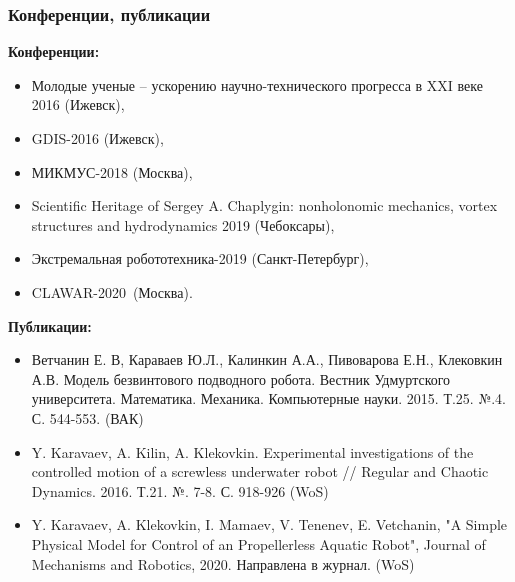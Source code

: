 \begin{frame}[shrink=25]
\frametitle{Конференции, публикации}

\textbf{Конференции:} 

\begin{itemize}
	
\item Молодые ученые -- ускорению научно-технического прогресса в XXI веке 2016 (Ижевск),

\item GDIS-2016 (Ижевск), 

\item МИКМУС-2018 (Москва), 

\item Scientific Heritage of Sergey A. Chaplygin: nonholonomic mechanics, vortex structures and hydrodynamics 2019 (Чебоксары), 

\item Экстремальная робототехника-2019  (Санкт-Петербург), 

\item CLAWAR-2020~(Москва).

\end{itemize}

\textbf{Публикации:}
\begin{itemize}

\item Ветчанин Е. В, Караваев Ю.Л., Калинкин А.А., Пивоварова Е.Н., Клековкин А.В. Модель безвинтового подводного робота. Вестник Удмуртского университета. Математика. Механика. Компьютерные науки. 2015. Т.25. №.4. С. 544-553. (ВАК)

\item Y. Karavaev, A. Kilin, A. Klekovkin. Experimental investigations of the controlled motion of a screwless underwater robot // Regular and Chaotic Dynamics. 2016. Т.21. №. 7-8. С. 918-926 (WoS)


\item Y. Karavaev, A. Klekovkin, I. Mamaev, V. Tenenev, E. Vetchanin, "A Simple Physical Model for Control of an Propellerless Aquatic Robot",  Journal of Mechanisms and Robotics, 2020. Направлена в журнал. (WoS)


\end{itemize}


\end{frame}
